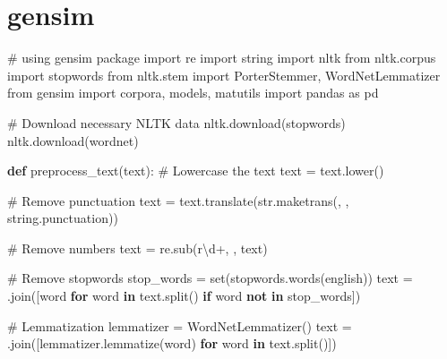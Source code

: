 \documentclass[
  letterpaper,
  DIV=11,
  numbers=noendperiod]{scrreprt}
\newenvironment{Shaded}{\begin{snugshade}}{\end{snugshade}}
\newcommand{\BuiltInTok}[1]{\textcolor[rgb]{0.00,0.23,0.31}{#1}}
\newcommand{\CommentTok}[1]{\textcolor[rgb]{0.37,0.37,0.37}{#1}}
\newcommand{\ControlFlowTok}[1]{\textcolor[rgb]{0.00,0.23,0.31}{\textbf{#1}}}
\newcommand{\DecValTok}[1]{\textcolor[rgb]{0.68,0.00,0.00}{#1}}
\newcommand{\ImportTok}[1]{\textcolor[rgb]{0.00,0.46,0.62}{#1}}
\newcommand{\KeywordTok}[1]{\textcolor[rgb]{0.00,0.23,0.31}{\textbf{#1}}}
\newcommand{\NormalTok}[1]{\textcolor[rgb]{0.00,0.23,0.31}{#1}}
\newcommand{\OperatorTok}[1]{\textcolor[rgb]{0.37,0.37,0.37}{#1}}
\newcommand{\StringTok}[1]{\textcolor[rgb]{0.13,0.47,0.30}{#1}}
\newcommand{\VerbatimStringTok}[1]{\textcolor[rgb]{0.13,0.47,0.30}{#1}}
\begin{document}
\section{gensim}

\begin{Shaded}
\begin{Highlighting}[]
\CommentTok{\# using gensim package}
\ImportTok{import}\NormalTok{ re}
\ImportTok{import}\NormalTok{ string}
\ImportTok{import}\NormalTok{ nltk}
\ImportTok{from}\NormalTok{ nltk.corpus }\ImportTok{import}\NormalTok{ stopwords}
\ImportTok{from}\NormalTok{ nltk.stem }\ImportTok{import}\NormalTok{ PorterStemmer, WordNetLemmatizer}
\ImportTok{from}\NormalTok{ gensim }\ImportTok{import}\NormalTok{ corpora, models, matutils}
\ImportTok{import}\NormalTok{ pandas }\ImportTok{as}\NormalTok{ pd}

\CommentTok{\# Download necessary NLTK data}
\NormalTok{nltk.download(}\StringTok{\textquotesingle{}stopwords\textquotesingle{}}\NormalTok{)}
\NormalTok{nltk.download(}\StringTok{\textquotesingle{}wordnet\textquotesingle{}}\NormalTok{)}

\KeywordTok{def}\NormalTok{ preprocess\_text(text):}
    \CommentTok{\# Lowercase the text}
\NormalTok{    text }\OperatorTok{=}\NormalTok{ text.lower()}
    
    \CommentTok{\# Remove punctuation}
\NormalTok{    text }\OperatorTok{=}\NormalTok{ text.translate(}\BuiltInTok{str}\NormalTok{.maketrans(}\StringTok{\textquotesingle{}\textquotesingle{}}\NormalTok{, }\StringTok{\textquotesingle{}\textquotesingle{}}\NormalTok{, string.punctuation))}
    
    \CommentTok{\# Remove numbers}
\NormalTok{    text }\OperatorTok{=}\NormalTok{ re.sub(}\VerbatimStringTok{r\textquotesingle{}}\DecValTok{\textbackslash{}d}\OperatorTok{+}\VerbatimStringTok{\textquotesingle{}}\NormalTok{, }\StringTok{\textquotesingle{}\textquotesingle{}}\NormalTok{, text)}
    
    \CommentTok{\# Remove stopwords}
\NormalTok{    stop\_words }\OperatorTok{=} \BuiltInTok{set}\NormalTok{(stopwords.words(}\StringTok{\textquotesingle{}english\textquotesingle{}}\NormalTok{))}
\NormalTok{    text }\OperatorTok{=} \StringTok{\textquotesingle{} \textquotesingle{}}\NormalTok{.join([word }\ControlFlowTok{for}\NormalTok{ word }\KeywordTok{in}\NormalTok{ text.split() }\ControlFlowTok{if}\NormalTok{ word }\KeywordTok{not} \KeywordTok{in}\NormalTok{ stop\_words])}
    
    \CommentTok{\# Lemmatization}
\NormalTok{    lemmatizer }\OperatorTok{=}\NormalTok{ WordNetLemmatizer()}
\NormalTok{    text }\OperatorTok{=} \StringTok{\textquotesingle{} \textquotesingle{}}\NormalTok{.join([lemmatizer.lemmatize(word) }\ControlFlowTok{for}\NormalTok{ word }\KeywordTok{in}\NormalTok{ text.split()])}
    

\end{Highlighting}
\end{Shaded}
\end{document}

